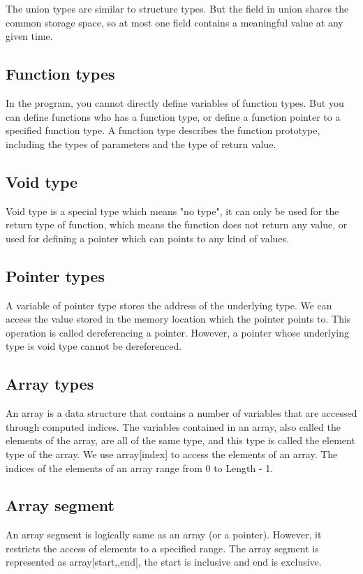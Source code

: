 \documentclass[a4paper]{article}
\DeclareRobustCommand{\mybox}[2][gray!20]{%
\begin{tcolorbox}[   %
        breakable,
        left=0pt,
        right=0pt,
        top=0pt,
        bottom=0pt,
        colback=#1,
        colframe=#1,
        width=\dimexpr\textwidth\relax, 
        enlarge left by=0mm,
        boxsep=5pt,
        arc=0pt,outer arc=0pt,
        ]
        #2
\end{tcolorbox}
}
\begin{document}
\mybox[gray!20]
{\color{blue}{}}

The union types are similar to structure types. But the field in union shares the common storage space, so at most one field contains a meaningful value at any given time.

{\color{lightblue}\subsection{Function types}}
In the program, you cannot directly define variables of function types. But you can define functions who has a function type, or define a function pointer to a specified function type.
A function type describes the function prototype, including the types of parameters and the type of return value.

{\color{lightblue}\subsection{Void type}}
Void type is a special type which means "no type", it can only be used for the return type of function, which means the function does not return any value, or used for defining a pointer which can points to any kind of values.

{\color{lightblue}\subsection{Pointer types}}
A variable of pointer type stores the address of the underlying type. We can access the value stored in the memory location which the pointer points to. This operation is called dereferencing a pointer. However, a pointer whose underlying type is void type cannot be dereferenced. 

{\color{lightblue}\subsection{Array types}}
An array is a data structure that contains a number of variables that are accessed through computed indices. The variables contained in an array, also called the elements of the array, are all of the same type, and this type is called the element type of the array. We use array[index] to access the elements of an array. The indices of the elements of an array range from 0 to Length - 1. 

{\color{lightblue}\subsection{Array segment}}
An array segment is logically same as an array (or a pointer). However, it restricts the access of elements to a specified range. The array segment is represented as array[start,,end], the start is inclusive and end is exclusive.
\end{document}
